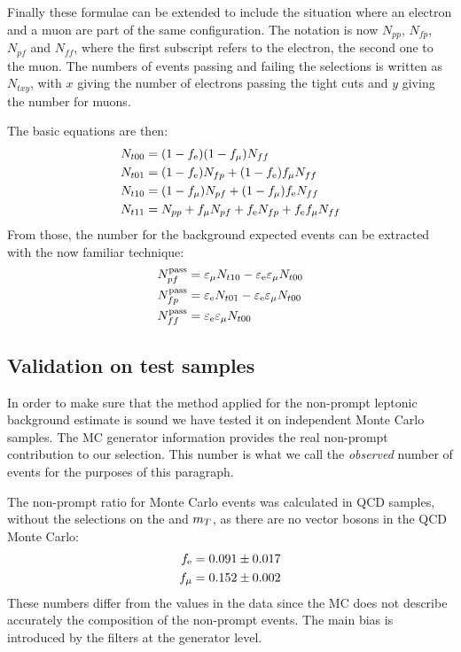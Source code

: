 Finally these formulae can be extended to include the situation where an
electron and a muon are part of the same configuration.
The notation is now $N_{pp}$, $N_{fp}$, $N_{pf}$ and $N_{ff}$, where the
first subscript refers to the electron, the second one to the muon. The
numbers of events passing and failing the selections is written as
$N_{txy}$, with $x$ giving the number of electrons passing the tight cuts
and $y$ giving the number for muons.

The basic equations are then:
\begin{align*}
    N_{t00} &= (1 - f_{\mathrm{e}})(1 - f_{\mu}) N_{ff}\\
    N_{t01} &= (1 - f_{\mathrm{e}})N_{fp} + (1 - f_{\mathrm{e}})f_{\mu} N_{ff}\\
    N_{t10} &= (1 - f_{\mu})N_{pf} + (1 - f_{\mu})f_{\mathrm{e}} N_{ff}\\
    N_{t11} &= N_{pp} + f_{\mu} N_{pf} + f_{\mathrm{e}} N_{fp} + f_{\mathrm{e}} f_{\mu} N_{ff}
\end{align*}
From those, the number for the background expected events can be extracted with the
now familiar technique:
\begin{align*}
    N_{pf}^\text{pass} &= \varepsilon_{\mu} N_{t10} - \varepsilon_{\mathrm{e}}
    \varepsilon_{\mu} N_{t00}\\
    N_{fp}^\text{pass} &= \varepsilon_{\mathrm{e}} N_{t01} -
    \varepsilon_{\mathrm{e}} \varepsilon_{\mu} N_{t00}\\
    N_{ff}^\text{pass} &= \varepsilon_{\mathrm{e}} \varepsilon_{\mu} N_{t00}
\end{align*}

\subsection{Validation on test samples}\label{sec:closure}
In order to make sure that the method applied for the non-prompt leptonic
background estimate is sound we have tested it on independent Monte Carlo
samples. The MC generator information provides the real non-prompt
contribution to our selection. This number is what we call the
\emph{observed} number of events for the purposes of this paragraph.

The non-prompt ratio for Monte Carlo events was calculated 
in QCD samples, without the selections on the
\met and $m_T$,  as there are no vector bosons in the QCD Monte Carlo:
\begin{align*}
    f_{\mathrm{e}} &= 0.091 \pm 0.017\\
    f_{\mu} &= 0.152 \pm 0.002
\end{align*}
These numbers differ from the values in the data since the MC does not
describe accurately the composition of the non-prompt events. The main
bias is introduced by the filters at the generator level.

